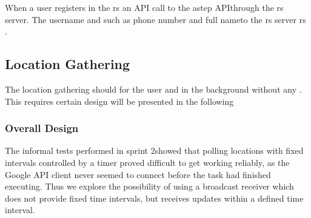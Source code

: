 \DIFaddend When a user registers in the \DIFdelbegin {}\DIFdelend \DIFaddbegin \gls{rs} \DIFaddend an API call \DIFdelbegin {}\DIFdelend \DIFaddbegin {}\DIFaddend to the \gls{astep} API\DIFdelbegin {}\DIFdelend \DIFaddbegin {}\DIFaddend through the \gls{rs} server. 
The username and \DIFdelbegin {}\DIFdelend \DIFaddbegin {}\DIFaddend such as phone number and full name\DIFdelbegin {}\DIFdelend \DIFaddbegin {}\DIFaddend to the \gls{rs} server \DIFdelbegin {}\DIFdelend \DIFaddbegin {}\gls{rs} \DIFaddend .


\subsection{Location Gathering}\DIFaddbegin \label{section:s3locgath}
\DIFaddend The location gathering should \DIFdelbegin {}\DIFdelend \DIFaddbegin {}\DIFaddend for the user and in the background without any \DIFdelbegin {}\DIFdelend \DIFaddbegin {}\DIFaddend . 
This requires certain design \DIFdelbegin {}\DIFdelend \DIFaddbegin {}\DIFaddend will be presented in the following \DIFdelbegin {}\DIFdelend \DIFaddbegin {}\DIFaddend 


\subsubsection{Overall Design}
The informal tests performed in sprint 2\DIFaddbegin {}\DIFaddend showed that polling locations with fixed intervals controlled by a timer proved difficult to get working reliably, as the Google API client never seemed to connect before the task had finished executing. 
Thus we explore the possibility of using a broadcast receiver which does not provide fixed time intervals, but receives updates within a defined time interval.

